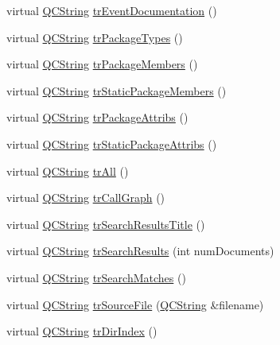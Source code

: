 \begin{DoxyCompactItemize}
virtual \hyperlink{class_q_c_string}{Q\+C\+String} \hyperlink{class_translator_norwegian_aacb68c4305d381ff5c6168b6d82636c7}{tr\+Event\+Documentation} ()
\item 
virtual \hyperlink{class_q_c_string}{Q\+C\+String} \hyperlink{class_translator_norwegian_ace11863f9cec6224bb4f532e27c5d47d}{tr\+Package\+Types} ()
\item 
virtual \hyperlink{class_q_c_string}{Q\+C\+String} \hyperlink{class_translator_norwegian_a0fc9891ef8aa0ef67e33def1488b9b28}{tr\+Package\+Members} ()
\item 
virtual \hyperlink{class_q_c_string}{Q\+C\+String} \hyperlink{class_translator_norwegian_a5a8d794eacb67225bea8b4bf892a4d38}{tr\+Static\+Package\+Members} ()
\item 
virtual \hyperlink{class_q_c_string}{Q\+C\+String} \hyperlink{class_translator_norwegian_aa694b0d893cb3f350746b32a392b9902}{tr\+Package\+Attribs} ()
\item 
virtual \hyperlink{class_q_c_string}{Q\+C\+String} \hyperlink{class_translator_norwegian_a0086614d2c15f91a0a0811c51f4b6ee6}{tr\+Static\+Package\+Attribs} ()
\item 
virtual \hyperlink{class_q_c_string}{Q\+C\+String} \hyperlink{class_translator_norwegian_a0d075dfe710b78a00bf505b0294d57e3}{tr\+All} ()
\item 
virtual \hyperlink{class_q_c_string}{Q\+C\+String} \hyperlink{class_translator_norwegian_a6bd49fa53e6372680815c3b39b425f1c}{tr\+Call\+Graph} ()
\item 
virtual \hyperlink{class_q_c_string}{Q\+C\+String} \hyperlink{class_translator_norwegian_a2840deb96af0a279a2221cd35db242e7}{tr\+Search\+Results\+Title} ()
\item 
virtual \hyperlink{class_q_c_string}{Q\+C\+String} \hyperlink{class_translator_norwegian_ad29c3555c4f77e08afde69b18aa3a984}{tr\+Search\+Results} (int num\+Documents)
\item 
virtual \hyperlink{class_q_c_string}{Q\+C\+String} \hyperlink{class_translator_norwegian_ad58212ebc2e1025eeb79a01886127697}{tr\+Search\+Matches} ()
\item 
virtual \hyperlink{class_q_c_string}{Q\+C\+String} \hyperlink{class_translator_norwegian_a44037b33f2a36b7216344c99a79d1f1e}{tr\+Source\+File} (\hyperlink{class_q_c_string}{Q\+C\+String} \&filename)
\item 
virtual \hyperlink{class_q_c_string}{Q\+C\+String} \hyperlink{class_translator_norwegian_a023f19a8e39b52387205eb1b1e7fb98d}{tr\+Dir\+Index} ()
\item 

\end{DoxyCompactItemize}
